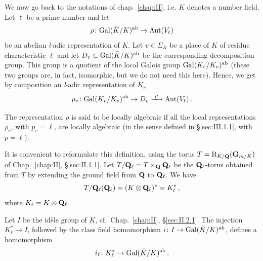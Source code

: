 


We now go back to the notations of chap.~\ref{chap:II}, i.e. $K$ denotes a
number field.  Let $\ell$ be a prime number and let
\[
\rho\colon \mathrm{Gal}(\bar K/K)^{\mathrm{ab}} \to \mathrm{Aut}(V_\ell)
\]
be an abelian \textit{l}-adic representation of $K$.  Let $v\in\Sigma_K$
be a place of $K$ of residue characteristic $\ell$ and let
$D_v\subset \mathrm{Gal}(\bar K/K)^{\mathrm{ab}}$ be the corresponding
decomposition group.  This group is a quotient of the local Galois group
$\mathrm{Gal}(\bar K_v/K_v)^{\mathrm{ab}}$ (these two groups are, in fact,
isomorphic, but we do not need this here).  Hence, we get by composition
an \textit{l}-adic representation of $K_v$
\[
\rho_v\colon \mathrm{Gal}(\bar K_v/K_v)^{\mathrm{ab}} \to D_v
\xrightarrow{\ \rho\ } \mathrm{Aut}(V_\ell)\,.
\]

\begin{dfn}
The representation $\rho$ is said to be locally algebraic if all the
local representations $\rho_v$, with $p_v=\ell$, are locally algebraic
(in the sense defined in \S\ref{sec:III.1.1}, with $p=\ell$).
\end{dfn}

It is convenient to reformulate this definition, using the torus
$T=\mathrm{R}_{K/\mathbf{Q}}(\mathbf{G}_{m/K})$ of Chap.~\ref{chap:II},
\S\ref{sec:II.1.1}.  Let $T/\mathbf{Q}_\ell = T\times_{\mathbf{Q}} \mathbf{Q}_\ell$ be the
$\mathbf{Q}_\ell$-torus obtained from $T$ by extending the ground field from $\mathbf{Q}$
to $\mathbf{Q}_\ell$.  We have
\[
T/\mathbf{Q}_\ell(\mathbf{Q}_\ell) = (K\mathbin{\otimes}\mathbf{Q}_\ell)^* = K_\ell^*\,,
\]
where $K_\ell = K\mathbin{\otimes}\mathbf{Q}_\ell$.

Let $I$ be the idèle group of $K$, cf.~Chap.~\ref{chap:II},
\S\ref{sec:II.2.1}.  The injection $K_\ell^*\to I$, followed by the class
field homomorphism $i\colon I\to\mathrm{Gal}(\bar K/K)^{\mathrm{ab}}$, defines a
homomorphism
\[
i_\ell\colon K_\ell^* \to \mathrm{Gal}(\bar K/K)^{\mathrm{ab}}\,.
\]

